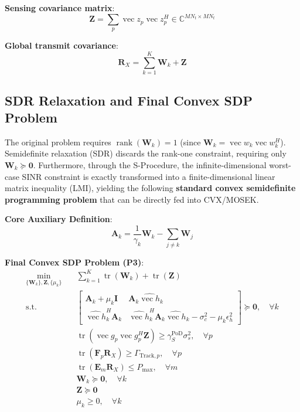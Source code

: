 \documentclass[12pt,a4paper]{article}
\DeclareMathOperator{\tr}{tr}
\DeclareMathOperator{\rank}{rank}
\DeclareMathOperator{\vect}{vec}
\newcommand{\mat}[1]{\mathbf{#1}}
\begin{document}
\textbf{Sensing covariance matrix}:
\begin{equation}
\mat{Z} = \sum_p \vect{z}_p \vect{z}_p^H \in \mathbb{C}^{MN_t \times MN_t} \tag{16}
\end{equation}

\textbf{Global transmit covariance}:
\begin{equation}
\mat{R}_X = \sum_{k=1}^K \mat{W}_k + \mat{Z} \tag{17}
\end{equation}

\subsection{SDR Relaxation and Final Convex SDP Problem}

The original problem requires $\rank(\mat{W}_k) = 1$ (since $\mat{W}_k = \vect{w}_k \vect{w}_k^H$). Semidefinite relaxation (SDR) discards the rank-one constraint, requiring only $\mat{W}_k \succeq \mat{0}$. Furthermore, through the S-Procedure, the infinite-dimensional worst-case SINR constraint is exactly transformed into a finite-dimensional linear matrix inequality (LMI), yielding the following \textbf{standard convex semidefinite programming problem} that can be directly fed into CVX/MOSEK.

\textbf{Core Auxiliary Definition}:
\begin{equation}
\mat{A}_k = \frac{1}{\gamma_k} \mat{W}_k - \sum_{j \neq k} \mat{W}_j
\end{equation}

\textbf{Final Convex SDP Problem (P3)}:
\begin{align}
\min_{\{\mat{W}_k\}, \mat{Z}, \{\mu_k\}} \quad & \sum_{k=1}^K \tr(\mat{W}_k) + \tr(\mat{Z}) \tag{P3} \\
\text{s.t.} \quad & \begin{bmatrix} \mat{A}_k + \mu_k \mat{I} & \mat{A}_k \hat{\vect{h}}_k \\[1.5ex] \hat{\vect{h}}_k^H \mat{A}_k & \hat{\vect{h}}_k^H \mat{A}_k \hat{\vect{h}}_k - \sigma_c^2 - \mu_k \epsilon_h^2 \end{bmatrix} \succeq \mat{0}, \quad \forall k \label{eq:lmi_comm} \\
& \tr(\vect{g}_p \vect{g}_p^H \mat{Z}) \geq \gamma_S^{\text{PoD}} \sigma_s^2, \quad \forall p \label{eq:sinr_sens_sdp} \\
& \tr(\mat{F}_p \mat{R}_X) \geq \Gamma_{\text{Track},p}, \quad \forall p \label{eq:pcrb_sdp} \\
& \tr(\mat{E}_m \mat{R}_X) \leq P_{\max}, \quad \forall m \label{eq:power_sdp} \\
& \mat{W}_k \succeq \mat{0}, \quad \forall k \label{eq:psd_w} \\
& \mat{Z} \succeq \mat{0} \label{eq:psd_z} \\
& \mu_k \geq 0, \quad \forall k \label{eq:mu_nonneg}
\end{align}
\end{document}
